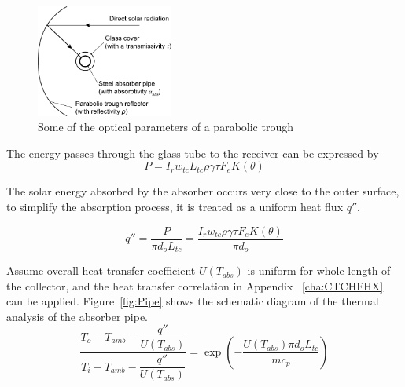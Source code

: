 \begin{figure}[!ht]
\centering
\includegraphics[width=0.4\textwidth]{fig/ParametersOfParablicDish.pdf}
\caption{Some of the optical parameters of a parabolic trough}\label{fig:ParabolicTrough}
\end{figure}

The energy passes through the glass tube to the receiver can be expressed by
\begin{equation}
  P = I_r w_{tc} L_{tc} \rho \gamma \tau F_e K(\theta)
\end{equation}

The solar energy absorbed by the absorber occurs very close to the outer surface, to simplify the absorption process, it is treated as a uniform heat flux $q''$.

\begin{equation}
  q''= \frac{P}{\pi d_o L_{tc}} = \frac{I_r w_{tc} \rho \gamma \tau F_e K(\theta)}{\pi d_o}
\end{equation}


Assume overall heat transfer coefficient $U(T_{abs})$ is uniform for whole length of the collector, and the heat transfer correlation in Appendix ~\ref{cha:CTCHFHX} can be applied. Figure~\ref{fig:Pipe} shows the schematic diagram of the thermal analysis of the absorber pipe.
\begin{equation}
	\frac{T_{o}-T_{amb}-\dfrac{q''}{U(T_{abs})}}{T_{i}-T_{amb}-\dfrac{q''}{U(T_{abs})}}=\exp(-\frac{U(T_{abs})\pi d_o L_{tc}}{\dot{m}c_{p}})\label{eq:CTCHF}
\end{equation}

